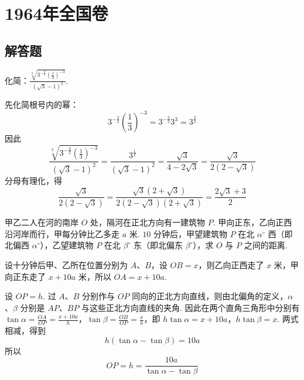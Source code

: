 
\chapter{1964年全国卷}

\section{解答题}

\begin{problem}
化简：\(\frac{\sqrt[3]{3^{-\frac32}\left( \frac13 \right)^{-3}}}{\left( \sqrt3-1 \right)^2}\).
\end{problem}

\begin{solution}
先化简根号内的幂：
\[
3^{-\frac32}\left( \frac13 \right)^{-3}=3^{-\frac32}3^3=3^{\frac32}
\]
因此
\[
\frac{\sqrt[3]{3^{-\frac32}\left( \frac13 \right)^{-3}}}{\left( \sqrt3-1 \right)^2}
=\frac{3^{\frac12}}{\left( \sqrt3-1 \right)^2}
=\frac{\sqrt3}{4-2\sqrt3}
=\frac{\sqrt3}{2\left( 2-\sqrt3 \right)}
\]
分母有理化，得
\[
\frac{\sqrt3}{2\left( 2-\sqrt3 \right)}
=\frac{\sqrt3\left( 2+\sqrt3 \right)}{2\left( 2-\sqrt3 \right)\left( 2+\sqrt3 \right)}
=\frac{2\sqrt3+3}{2}
\]
\end{solution}

\begin{problem}
甲乙二人在河的南岸 \(O\) 处，隔河在正北方向有一建筑物 \(P\). 甲向正东，乙向正西沿河岸而行，甲每分钟比乙多走 \(a\text{ 米}\). \(10\) 分钟后，甲望建筑物 \(P\) 在北 \(\alpha^\circ\) 西（即北偏西 \(\alpha^\circ\)），乙望建筑物 \(P\) 在北 \(\beta^\circ\) 东（即北偏东 \(\beta^\circ\)），求 \(O\) 与 \(P\) 之间的距离.
\end{problem}

\begin{solution}
设十分钟后甲、乙所在位置分别为 \(A\)、\(B\)，设 \(OB=x\)，则乙向正西走了 \(x\) 米，甲向正东走了 \(x+10a\) 米，所以 \(OA=x+10a\).


设 \(OP=h\). 过 \(A\)、\(B\) 分别作与 \(OP\) 同向的正北方向直线，则由北偏角的定义，\(\alpha\)、\(\beta\) 分别是 \(AP\)、\(BP\) 与这些正北方向直线的夹角. 因此在两个直角三角形中分别有
\(\tan\alpha=\frac{OA}{OP}=\frac{x+10a}{h}\)，\(\tan\beta=\frac{OB}{OP}=\frac{x}{h}\)，即 \(h\tan\alpha=x+10a\)，\(h\tan\beta=x\).
两式相减，得到
\[
h\left( \tan\alpha-\tan\beta \right)=10a
\]
所以
\[
OP=h=\frac{10a}{\tan\alpha-\tan\beta}
\]
\end{solution}

